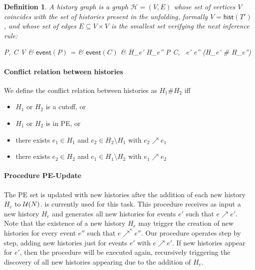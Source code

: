 \documentclass[11pt]{article}
\newtheorem{definition}{Definition}
\newcommand{\event}[1]{\ensuremath{\mathsf{event}(#1)}}
\newcommand{\hist}[1]{\ensuremath{\mathsf{hist}(#1)}}
\newcommand{\h}{\ensuremath{\mathcal{H}}}
\newcommand{\pe}{{\sc PE}}
\newcommand{\peupdate}{{\sc PE-Update}}
\begin{document}
\begin{definition}

A \emph{history graph} is a graph $\h = (V, E)$ whose set of vertices $V$
coincides with the set of histories present in the unfolding, formally $V =
\hist{T'}$, and whose set of edges $E \subseteq V \times V$ is the smallest set
verifying the next inference rule:

\begin{center}
	{P, C \subseteq V &
	\event{P} =  \cup {} &
	\event{C} \subseteq {} &
	\forall H_{e'} H_{e''} \in P \cup C, \ e' \neq e'' \land \neg (H_{e'} \# H_{e''})
	}
\end{center}

\end{definition}


\paragraph{Conflict relation between histories}  We define the conflict
relation between histories as $H_1 \# H_2 $ iff
\begin{itemize}
\item $H_1$ or $H_2$ is a cutoff, or 
\item $H_1$ or $H_2$ is in \pe{}, or
\item there exists $e_1 \in H_1$ and $e_2 \in H_2 \setminus H_1$ with $e_2
\nearrow e_1$
\item there exists $e_2 \in H_2$ and $e_1 \in H_1 \setminus H_2$ with $e_1
\nearrow e_2$
\end{itemize}

\paragraph{Procedure \peupdate{}}  The \pe{} set is updated with new histories
after the addition of each new history $H_e$ to $\mathcal{U}(N)$.   is
currently used for this task.  This procedure receives as input a new history
$H_e$ and generates all new histories for events $e'$ such that $e \nearrow
e'$.  Note that the existence of a new history $H_e$ may trigger the creation
of new histories for every event $e''$ such that $e \nearrow^* e''$.  Our
procedure operates step by step, adding new histories just for events $e'$ with
$e \nearrow e'$.  If new histories appear for $e'$, then the procedure will be
executed again, recursively triggering the discovery of all new histories
appearing due to the addition of $H_e$.
\end{document}
